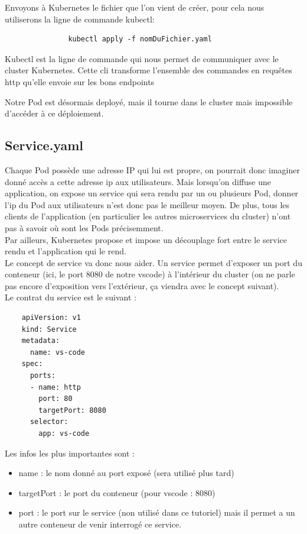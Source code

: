 \documentclass[11pt,fleqn]{book} %
\begin{document}
Envoyons à Kubernetes le fichier que l'on vient de créer, pour cela nous utiliserons la ligne de commande kubectl:
\begin{verbatim}
               kubectl apply -f nomDuFichier.yaml
\end{verbatim}
Kubectl est la ligne de commande qui nous permet de communiquer avec le cluster Kubernetes. Cette cli transforme l'ensemble des commandes en requêtes http qu'elle envoie sur les bons endpoints\newline

Notre Pod est désormais deployé, mais il tourne dans le cluster mais impossible d'accéder à ce déploiement. 
\subsection*{Service.yaml}
Chaque Pod possède une adresse IP qui lui est propre, on pourrait donc imaginer donné accès a cette adresse ip aux utilisateurs. Mais lorsqu'on diffuse une application, on expose un service qui sera rendu par un ou plusieurs Pod, donner l'ip du Pod aux utilisateurs n'est donc pas le meilleur moyen. De plus, tous les clients de l'application (en particulier les autres microservices du cluster) n'ont pas à savoir où sont les Pods précisemment. \\

Par ailleurs, Kubernetes propose et impose un découplage fort entre le service rendu et l'application qui le rend. \\ 

Le concept de service va donc nous aider. Un service permet d'exposer un port du conteneur (ici, le port 8080 de notre vscode) à l'intérieur du cluster (on ne parle pas encore d'exposition vers l'extérieur, ça viendra avec le concept suivant). \\
Le contrat du service est le suivant : 
\begin{verbatim}
    apiVersion: v1
    kind: Service
    metadata:
      name: vs-code
    spec:
      ports:
      - name: http
        port: 80
        targetPort: 8080
      selector:
        app: vs-code
\end{verbatim}
Les infos les plus importantes sont : 
\begin{itemize}
    \item name : le nom donné au port exposé (sera utilisé plus tard)
    \item targetPort : le port du conteneur (pour vscode : 8080)
    \item port : le port sur le service (non utilisé dans ce tutoriel) mais il permet a un autre conteneur de venir interrogé ce service.\\
\end{itemize}
\end{document}
